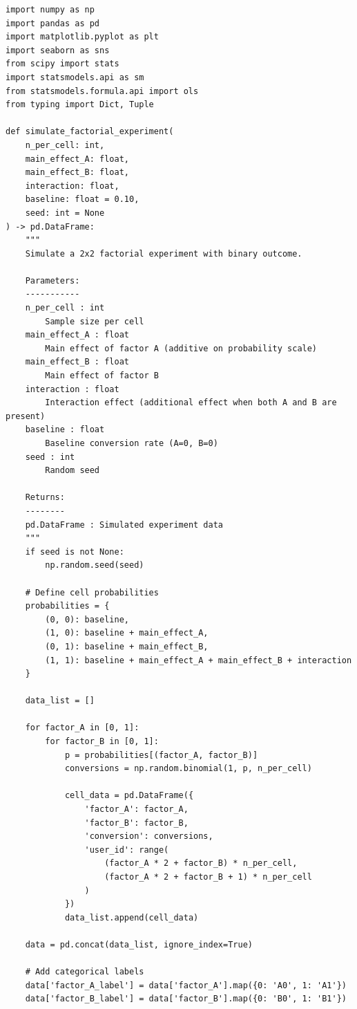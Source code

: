 \lstset{language=Python, caption=Comprehensive Factorial Design Analysis}
\begin{lstlisting}
import numpy as np
import pandas as pd
import matplotlib.pyplot as plt
import seaborn as sns
from scipy import stats
import statsmodels.api as sm
from statsmodels.formula.api import ols
from typing import Dict, Tuple

def simulate_factorial_experiment(
    n_per_cell: int,
    main_effect_A: float,
    main_effect_B: float,
    interaction: float,
    baseline: float = 0.10,
    seed: int = None
) -> pd.DataFrame:
    """
    Simulate a 2x2 factorial experiment with binary outcome.

    Parameters:
    -----------
    n_per_cell : int
        Sample size per cell
    main_effect_A : float
        Main effect of factor A (additive on probability scale)
    main_effect_B : float
        Main effect of factor B
    interaction : float
        Interaction effect (additional effect when both A and B are present)
    baseline : float
        Baseline conversion rate (A=0, B=0)
    seed : int
        Random seed

    Returns:
    --------
    pd.DataFrame : Simulated experiment data
    """
    if seed is not None:
        np.random.seed(seed)

    # Define cell probabilities
    probabilities = {
        (0, 0): baseline,
        (1, 0): baseline + main_effect_A,
        (0, 1): baseline + main_effect_B,
        (1, 1): baseline + main_effect_A + main_effect_B + interaction
    }

    data_list = []

    for factor_A in [0, 1]:
        for factor_B in [0, 1]:
            p = probabilities[(factor_A, factor_B)]
            conversions = np.random.binomial(1, p, n_per_cell)

            cell_data = pd.DataFrame({
                'factor_A': factor_A,
                'factor_B': factor_B,
                'conversion': conversions,
                'user_id': range(
                    (factor_A * 2 + factor_B) * n_per_cell,
                    (factor_A * 2 + factor_B + 1) * n_per_cell
                )
            })
            data_list.append(cell_data)

    data = pd.concat(data_list, ignore_index=True)

    # Add categorical labels
    data['factor_A_label'] = data['factor_A'].map({0: 'A0', 1: 'A1'})
    data['factor_B_label'] = data['factor_B'].map({0: 'B0', 1: 'B1'})


\end{lstlisting}
